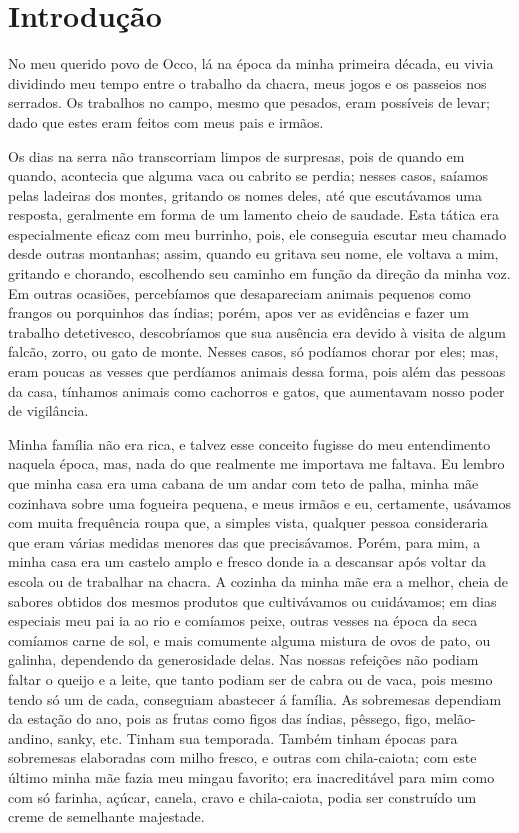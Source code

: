 \cleardoublepage
\newpage
\chapter*{Introdução} %

No meu querido povo de Occo, lá na época da minha primeira década, eu vivia dividindo meu tempo entre o trabalho da chacra, meus jogos e os passeios nos serrados.
Os trabalhos no campo, mesmo que pesados, eram possíveis de levar; dado que estes eram feitos com meus pais e irmãos.

Os dias na serra não transcorriam limpos de surpresas, pois de quando em quando, acontecia que alguma vaca ou cabrito se perdia; nesses casos, saíamos pelas ladeiras dos montes, gritando os nomes deles, até que escutávamos uma resposta, geralmente em forma de um lamento cheio de saudade.
Esta tática era especialmente eficaz com meu burrinho, pois, ele conseguia escutar meu chamado desde outras montanhas; assim, quando eu gritava seu nome, ele voltava a mim, gritando e chorando, escolhendo seu caminho em função da direção da minha voz.
Em outras ocasiões, percebíamos que desapareciam animais pequenos como frangos ou porquinhos das índias; porém, apos ver as evidências e fazer um trabalho detetivesco, descobríamos que sua ausência era devido à visita de algum falcão, zorro, ou gato de monte.
Nesses casos, só podíamos chorar por eles; mas,  eram poucas as vesses que perdíamos animais dessa forma, pois além das pessoas da casa, tínhamos animais como cachorros e gatos, que aumentavam nosso poder de vigilância.

Minha família não era rica, e talvez esse conceito fugisse do meu entendimento naquela época, mas, nada do que realmente me importava me faltava.
Eu lembro que minha casa era uma cabana de um andar com teto de palha, minha mãe cozinhava sobre uma fogueira pequena, e meus irmãos e eu, certamente, usávamos com muita frequência roupa que, a simples vista, qualquer pessoa consideraria que eram várias medidas menores das que precisávamos.
Porém, para mim, a minha casa era um castelo amplo e fresco donde ia a descansar após voltar da escola ou de trabalhar na chacra. 
A cozinha da minha mãe era a melhor, cheia de sabores obtidos dos mesmos produtos que cultivávamos ou cuidávamos; em dias especiais meu pai ia ao rio e comíamos peixe, outras vesses na época da seca comíamos carne de sol, e mais comumente alguma mistura de ovos de pato, ou galinha, dependendo da generosidade delas.
Nas nossas refeições não podiam faltar o queijo e a leite, que tanto podiam ser de cabra ou de vaca, pois mesmo tendo só um de cada, conseguiam abastecer á família.
As sobremesas dependiam da estação do ano, pois as frutas como figos das índias, pêssego, figo, melão-andino, sanky, etc. Tinham sua temporada. Também tinham épocas para sobremesas elaboradas com milho fresco, e outras com chila-caiota; com este último minha mãe fazia meu mingau favorito; era inacreditável para mim como com só farinha, açúcar, canela, cravo e chila-caiota, podia ser construído um creme de semelhante majestade.

